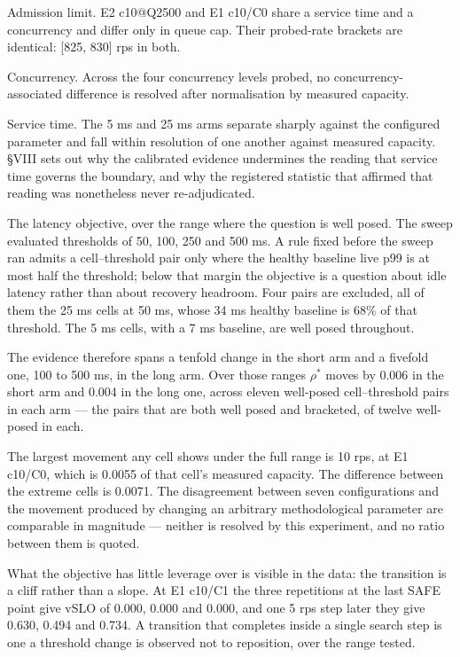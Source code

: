 \documentclass{ieeeaccess}
\begin{document}
Admission limit. E2 c10@Q2500 and E1 c10/C0 share a service time and a concurrency and differ only in queue cap. Their probed-rate brackets are identical: [825, 830] rps in both.

Concurrency. Across the four concurrency levels probed, no concurrency-associated difference is resolved after normalisation by measured capacity.

Service time. The 5 ms and 25 ms arms separate sharply against the configured parameter and fall within resolution of one another against measured capacity. \S{}VIII sets out why the calibrated evidence undermines the reading that service time governs the boundary, and why the registered statistic that affirmed that reading was nonetheless never re-adjudicated.

The latency objective, over the range where the question is well posed. The sweep evaluated thresholds of 50, 100, 250 and 500 ms. A rule fixed before the sweep ran admits a cell--threshold pair only where the healthy baseline live p99 is at most half the threshold; below that margin the objective is a question about idle latency rather than about recovery headroom. Four pairs are excluded, all of them the 25 ms cells at 50 ms, whose 34 ms healthy baseline is 68\% of that threshold. The 5 ms cells, with a 7 ms baseline, are well posed throughout.

The evidence therefore spans a tenfold change in the short arm and a fivefold one, 100 to 500 ms, in the long arm. Over those ranges $\rho^{*}$ moves by 0.006 in the short arm and 0.004 in the long one, across eleven well-posed cell--threshold pairs in each arm --- the pairs that are both well posed and bracketed, of twelve well-posed in each.

The largest movement any cell shows under the full range is 10 rps, at E1 c10/C0, which is 0.0055 of that cell's measured capacity. The difference between the extreme cells is 0.0071. The disagreement between seven configurations and the movement produced by changing an arbitrary methodological parameter are comparable in magnitude --- neither is resolved by this experiment, and no ratio between them is quoted.

What the objective has little leverage over is visible in the data: the transition is a cliff rather than a slope. At E1 c10/C1 the three repetitions at the last SAFE point give vSLO of 0.000, 0.000 and 0.000, and one 5 rps step later they give 0.630, 0.494 and 0.734. A transition that completes inside a single search step is one a threshold change is observed not to reposition, over the range tested.
\end{document}
